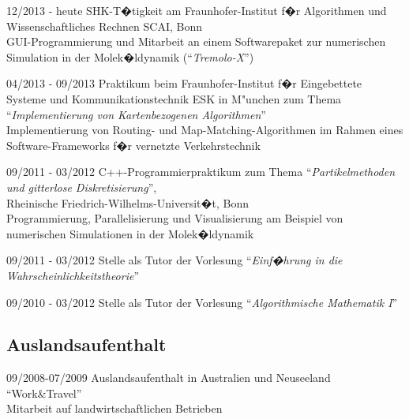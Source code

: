 \documentclass[a4papers]{scrartcl}
\begin{document}
\begin{list}{}
{\setlength{\topsep}{1.0cm}
\setlength{\itemsep}{0cm}
\setlength{\leftmargin}{3.6cm}
\setlength{\labelwidth}{3.2cm}
\setlength{\labelsep}{0.4cm}
\renewcommand{\makelabel}[1]{\fontfamily{cmss}\fontseries{x}\fontshape{n}
\selectfont #1}}
\item[12/2013 - heute] SHK-T�tigkeit am Fraunhofer-Institut f�r
  Algorithmen und Wissenschaftliches Rechnen SCAI, Bonn \\
  GUI-Programmierung und Mitarbeit an einem Softwarepaket zur
  numerischen Simulation in der Molek�ldynamik (``\textit{Tremolo-X}'')
\item[04/2013 - 09/2013] Praktikum beim Fraunhofer-Institut f�r
  Eingebettete Systeme und Kommunikationstechnik ESK in  M"unchen zum
  Thema ``\textit{Implementierung von Kartenbezogenen Algorithmen}''\\
  Implementierung von Routing- und Map-Matching-Algorithmen im Rahmen
  eines Software-Frameworks f�r vernetzte Verkehrstechnik
\item[09/2011 - 03/2012] C++-Programmierpraktikum zum Thema
  ``\textit{Partikelmethoden und gitterlose Diskretisierung}'', \\
  Rheinische Friedrich-Wilhelms-Universit�t, Bonn\\
  Programmierung, Parallelisierung und Visualisierung am Beispiel von
  numerischen Simulationen in der Molek�ldynamik
\item[09/2011 - 03/2012] Stelle als Tutor der Vorlesung
  ``\textit{Einf�hrung in die Wahrscheinlichkeitstheorie}''
\item[09/2010 - 03/2012] Stelle als Tutor der Vorlesung
  ``\textit{Algorithmische Mathematik I}''
\end{list}


\vspace{-2.5\baselineskip}
\subsection{Auslandsaufenthalt}

\begin{list}{}
{\setlength{\topsep}{1.0cm}
\setlength{\itemsep}{0cm}
\setlength{\leftmargin}{3.6cm}
\setlength{\labelwidth}{3.2cm}
\setlength{\labelsep}{0.4cm}
\renewcommand{\makelabel}[1]{\fontfamily{cmss}\fontseries{x}\fontshape{n}
\selectfont #1}}
\item[09/2008-07/2009] Auslandsaufenthalt in Australien und Neuseeland
  ``Work\&Travel''\\
  Mitarbeit auf landwirtschaftlichen Betrieben
\end{list}
\end{document}
